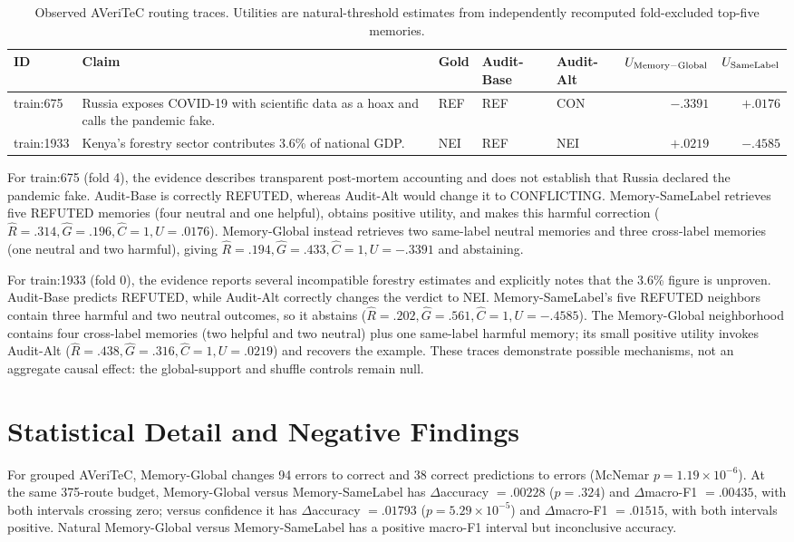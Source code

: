 \documentclass[runningheads]{llncs}
\begin{document}
\begin{table}[t]
\caption{Observed AVeriTeC routing traces. Utilities are natural-threshold
estimates from independently recomputed fold-excluded top-five memories.}
\label{tab:worked-cases}
\centering\small
\begin{tabular}{lp{}lllrr}
\toprule
ID & Claim & Gold & Audit-Base & Audit-Alt & $U_{\rm Memory-Global}$ & $U_{\rm SameLabel}$ \\
\midrule
train:675 & Russia exposes COVID-19 with scientific data as a hoax and calls
the pandemic fake. & REF & REF & CON & $-.3391$ & $+.0176$ \\
train:1933 & Kenya's forestry sector contributes 3.6\% of national GDP. & NEI
& REF & NEI & $+.0219$ & $-.4585$ \\
\bottomrule
\end{tabular}
\end{table}

For train:675 (fold 4), the evidence describes transparent post-mortem accounting and
does not establish that Russia declared the pandemic fake. Audit-Base is correctly
REFUTED, whereas Audit-Alt would change it to CONFLICTING. Memory-SameLabel retrieves five
REFUTED memories (four neutral and one helpful), obtains positive utility,
and makes this harmful correction
($\widehat R=.314,\widehat G=.196,\widehat C=1,U=.0176$). Memory-Global instead retrieves two same-label
neutral memories and three cross-label memories (one neutral and two harmful),
giving $\widehat R=.194,\widehat G=.433,\widehat C=1,U=-.3391$ and abstaining.

For train:1933 (fold 0), the evidence reports several incompatible forestry estimates
and explicitly notes that the 3.6\% figure is unproven. Audit-Base predicts REFUTED,
while Audit-Alt correctly changes the verdict to NEI. Memory-SameLabel's five REFUTED
neighbors contain three harmful and two neutral outcomes, so it abstains
($\widehat R=.202,\widehat G=.561,\widehat C=1,U=-.4585$). The
Memory-Global neighborhood contains four cross-label memories (two helpful and two
neutral) plus one same-label harmful memory; its small positive utility invokes
Audit-Alt ($\widehat R=.438,\widehat G=.316,\widehat C=1,U=.0219$) and recovers the
example. These traces demonstrate possible mechanisms,
not an aggregate causal effect: the global-support and shuffle controls remain null.

\section{Statistical Detail and Negative Findings}
For grouped AVeriTeC, Memory-Global changes 94 errors to correct and 38 correct
predictions to errors (McNemar $p=1.19\times10^{-6}$). At the same 375-route
budget, Memory-Global versus Memory-SameLabel has $\Delta$accuracy $=.00228$ ($p=.324$) and
$\Delta$macro-F1 $=.00435$, with both intervals crossing zero; versus
confidence it has $\Delta$accuracy $=.01793$ ($p=5.29\times10^{-5}$) and
$\Delta$macro-F1 $=.01515$, with both intervals positive. Natural Memory-Global versus
Memory-SameLabel has a positive macro-F1 interval but inconclusive accuracy.
\end{document}
